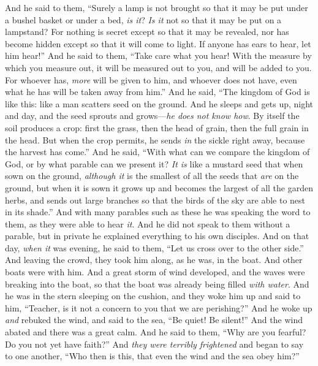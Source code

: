 \begin{biblechapter}
 And he said to them, “Surely a lamp is not brought so that it may be put under a bushel basket or under a bed, \textit{is it}? \textit{Is it} not so that it may be put on a lampstand?
\verse For nothing is secret except so that it may be revealed, nor has become hidden except so that it will come to light.
\verse If anyone has ears to hear, let him hear!”
\verse And he said to them, “Take care what you hear! With the measure by which you measure out, it will be measured out to you, and will be added to you.
\verse For whoever has, \textit{more} will be given to him, and whoever does not have, even what he has will be taken away from him.”
 And he said, “The kingdom of God is like this: like a man scatters seed on the ground.
\verse And he sleeps and gets up, night and day, and the seed sprouts and grows—\textit{he does not know how}.
\verse By itself the soil produces a crop: first the grass, then the head of grain, then the full grain in the head.
\verse But when the crop permits, he sends \textit{in} the sickle right away, because the harvest has come.”
 And he said, “With what can we compare the kingdom of God, or by what parable can we present it?
\verse \textit{It is} like a mustard seed that when sown on the ground, \textit{although it} is the smallest of all the seeds that \textit{are} on the ground,
\verse but when it is sown it grows up and becomes the largest of all the garden herbs, and sends out large branches so that the birds of the sky are able to nest in its shade.”
\verse And with many parables such as these he was speaking the word to them, as they were able to hear \textit{it}.
\verse And he did not speak to them without a parable, but in private he explained everything to his own disciples.
 And on that day, \textit{when it} was evening, he said to them, “Let us cross over to the other side.”
\verse And leaving the crowd, they took him along, as he was, in the boat. And other boats were with him.
\verse And a great storm of wind developed, and the waves were breaking into the boat, so that the boat was already being filled \textit{with water}.
\verse And he was in the stern sleeping on the cushion, and they woke him up and said to him, “Teacher, is it not a concern to you that we are perishing?”
\verse And he woke up \textit{and} rebuked the wind, and said to the sea, “Be quiet! Be silent!” And the wind abated and there was a great calm.
\verse And he said to them, “Why are you fearful? Do you not yet have faith?”
\verse And \textit{they were terribly frightened} and began to say to one another, “Who then is this, that even the wind and the sea obey him?”
\end{biblechapter}

